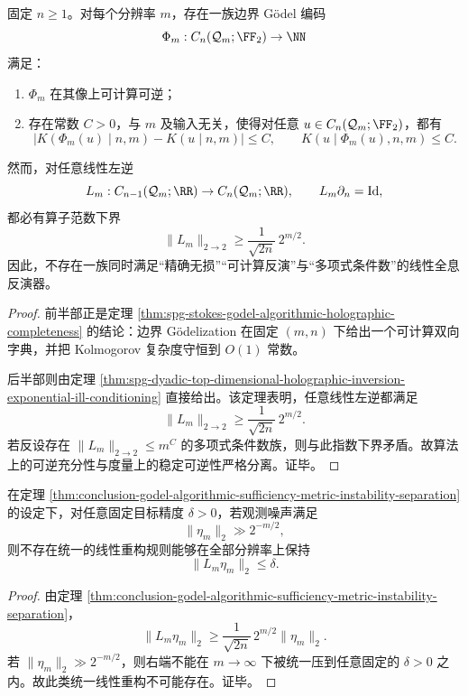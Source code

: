 \begin{theorem}[算法充分性与度量稳定性的指数分离]\label{thm:conclusion-godel-algorithmic-sufficiency-metric-instability-separation}
固定 \(n\ge 1\)。对每个分辨率 \(m\)，存在一族边界 Gödel 编码
\[
\Phi_m:C_n(\mathcal Q_m;\FF_2)\to\NN
\]
满足：
\begin{enumerate}
  \item \(\Phi_m\) 在其像上可计算可逆；
  \item 存在常数 \(C>0\)，与 \(m\) 及输入无关，使得对任意 \(u\in C_n(\mathcal Q_m;\FF_2)\)，都有
        \[
        \bigl|K(\Phi_m(u)\mid n,m)-K(u\mid n,m)\bigr|\le C,
        \qquad
        K(u\mid \Phi_m(u),n,m)\le C.
        \]
\end{enumerate}
然而，对任意线性左逆
\[
L_m:C_{n-1}(\mathcal Q_m;\RR)\to C_n(\mathcal Q_m;\RR),
\qquad
L_m\partial_n=\mathrm{Id},
\]
都必有算子范数下界
\[
\|L_m\|_{2\to 2}\ge \frac{1}{\sqrt{2n}}\,2^{m/2}.
\]
因此，不存在一族同时满足“精确无损”“可计算反演”与“多项式条件数”的线性全息反演器。
\end{theorem}

\begin{proof}
前半部正是定理 \ref{thm:spg-stokes-godel-algorithmic-holographic-completeness} 的结论：边界 Gödelization 在固定 \((m,n)\) 下给出一个可计算双向字典，并把 Kolmogorov 复杂度守恒到 \(O(1)\) 常数。

后半部则由定理 \ref{thm:spg-dyadic-top-dimensional-holographic-inversion-exponential-ill-conditioning} 直接给出。该定理表明，任意线性左逆都满足
\[
\|L_m\|_{2\to 2}\ge \frac{1}{\sqrt{2n}}\,2^{m/2}.
\]
若反设存在 \(\|L_m\|_{2\to 2}\le m^C\) 的多项式条件数族，则与此指数下界矛盾。故算法上的可逆充分性与度量上的稳定可逆性严格分离。证毕。
\end{proof}

\begin{corollary}[噪声阈值下的统一线性重构不可能性]\label{cor:conclusion-godel-noise-threshold-no-uniform-linear-reconstruction}
在定理 \ref{thm:conclusion-godel-algorithmic-sufficiency-metric-instability-separation} 的设定下，对任意固定目标精度 \(\delta>0\)，若观测噪声满足
\[
\|\eta_m\|_2\gg 2^{-m/2},
\]
则不存在统一的线性重构规则能够在全部分辨率上保持
\[
\|L_m\eta_m\|_2\le \delta.
\]
\end{corollary}

\begin{proof}
由定理 \ref{thm:conclusion-godel-algorithmic-sufficiency-metric-instability-separation}，
\[
\|L_m\eta_m\|_2\ge \frac{1}{\sqrt{2n}}\,2^{m/2}\|\eta_m\|_2.
\]
若 \(\|\eta_m\|_2\gg 2^{-m/2}\)，则右端不能在 \(m\to\infty\) 下被统一压到任意固定的 \(\delta>0\) 之内。故此类统一线性重构不可能存在。证毕。
\end{proof}

